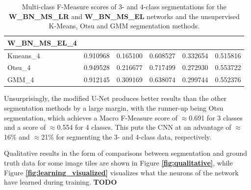 \begin {table}
\begin{flushleft}
\begin {tabular}[!htb]{|l|l|l|l|l|l|}
			W\_BN\_MS\_EL\_4& & & & &  \\ \hline
			Kmeans\_4& 0.910968& 0.165100& 0.608527& 0.332654& 0.515816 \\ \hline
			Otsu\_4& 0.949528& 0.216677& 0.717499& 0.272930& 0.553722 \\ \hline
			GMM\_4& 0.912145& 0.309169& 0.638074& 0.299744& 0.552376 \\ \hline
		\end {tabular}
	\end {flushleft}
\caption[Multi-class F-Measure scores for final network and other image segmentation metods.]{Multi-class F-Measure scores of 3- and 4-class segmentations for the \textbf{W\_BN\_MS\_LR} and \textbf{W\_BN\_MS\_EL} networks and the unsupervised K-Means, Otsu and GMM segmentation methods.}
\label{tab:resultsfinal}
\end {table}

Unsurprisingly, the modified U-Net produces better results than the other segmentation methods by a large margin, with the runner-up being Otsu segmentation, which achieves a Macro F-Measure score of $\approx$0.691 for 3 classes and a score of $\approx$0.554 for 4 classes. This puts the CNN at an advantage of $\approx$16\% and $\approx$21\% for segmenting the 3- and 4-class data, respectively. 

Qualitative results in the form of comparisons between segmentation and ground truth data for some image tiles are shown in Figure \textbf{\ref{fig:qualitative}}, while Figure \textbf{\ref{fig:learning_visualized}} visualizes what the neurons of the network have learned during training. \textbf{TODO}

